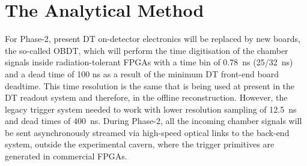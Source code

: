 \documentclass[../main.tex]{subfiles}
\begin{document}
\chapter{The Analytical Method}
\label{dts:chapter:intro}

For Phase-2, present DT on-detector electronics will be replaced by new boards, the so-called OBDT, which will perform the time digitisation of the chamber signals inside radiation-tolerant FPGAs with a time bin of 0.78~ns (25/32~ns) and a dead time of 100 ns as a result of the minimum DT front-end board deadtime. This time resolution is the same that is being used at present in the DT readout system and therefore, in the offline reconstruction. However, the legacy trigger system needed to work with lower resolution sampling of 12.5~ns and dead times of 400~ns. During Phase-2, all the incoming chamber signals will be sent asynchronously streamed via high-speed optical links to the back-end system, outside the experimental cavern, where the trigger primitives are generated in commercial FPGAs. 
\end{document}
